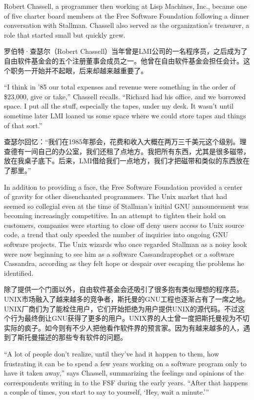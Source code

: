 \ifdefined\eng
Robert Chassell, a programmer then working at Lisp Machines, Inc., became one of five charter board members at the Free Software Foundation following a dinner conversation with Stallman. Chassell also served as the organization's treasurer, a role that started small but quickly grew.
\fi

\ifdefined\chs
罗伯特·查瑟尔（Robert Chassell）当年曾是LMI公司的一名程序员，之后成为了自由软件基金会的五个注册董事会成员之一。他曾在自由软件基金会担任会计。这个职务一开始并不起眼，后来却越来越重要了。
\fi

\ifdefined\eng
``I think in '85 our total expenses and revenue were something in the order of \$23,000, give or take,'' Chassell recalls. ``Richard had his office, and we borrowed space. I put all the stuff, especially the tapes, under my desk. It wasn't until sometime later LMI loaned us some space where we could store tapes and things of that sort.''
\fi

\ifdefined\chs
查瑟尔回忆：``我们在1985年那会，花费和收入大概在两万三千美元这个级别。理查德有一间自己的办公室，我们还租了点地方。我把所有东西，尤其是很多磁带，放在我桌子底下。后来，LMI借给我们一点地方，我们才把磁带和类似的东西放在了那里。''
\fi

\ifdefined\eng
In addition to providing a face, the Free Software Foundation provided a center of gravity for other disenchanted programmers. The Unix market that had seemed so collegial even at the time of Stallman's initial GNU announcement was becoming increasingly competitive. In an attempt to tighten their hold on customers, companies were starting to \ifdefined\vone close off \fi\ifdefined\vtwo deny \fi users access to Unix source code, a trend that only speeded the number of inquiries into ongoing GNU software projects. The Unix wizards who once regarded Stallman as a noisy kook were now beginning to see him as a software \ifdefined\vone Cassandra\fi\ifdefined\vtwo prophet or a software Cassandra, according as they felt hope or despair over escaping the problems he identified\fi.
\fi

\ifdefined\chs
除了提供一个门面以外，自由软件基金会还吸引了很多抱有类似理想的程序员。UNIX市场融入了越来越多的竞争者，斯托曼的GNU工程也逐渐占有了一席之地。UNIX厂商们为了能栓住用户，它们开始拒绝为用户提供UNIX的源代码。不过这个行为最终倒让GNU获得了更多的用户。UNIX界的人士曾一度把斯托曼视为不切实际的疯子。如今则有不少人把他看作软件界的预言家。\ifdefined\vtwo 因为有越来越多的人，遇到了斯托曼描述的那些专有软件的问题。\fi
\fi

\ifdefined\eng
``A lot of people don't realize, until they've had it happen to them, how frustrating it can be to spend a few years working on a software program only to have it taken away,'' says Chassell, summarizing the feelings and opinions of the correspondents writing in to the FSF during the early years. ``After that happens a couple of times, you start to say to yourself, `Hey, wait a minute.'\hspace{0.01in}''
\fi

